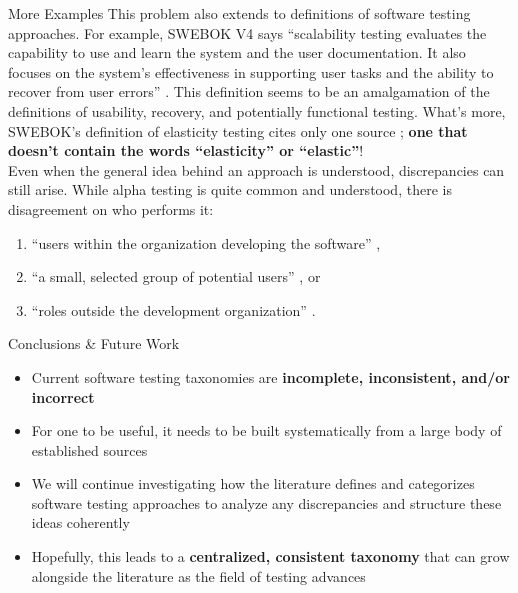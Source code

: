 \documentclass[22pt]{beamer}
\begin{document}
\begin{frame}[fragile]
\begin{textblock}{7.25}
\begin{block}{\fontsize{37}{20}\selectfont More Examples}
            This problem also extends to definitions of software testing
            approaches. For example, SWEBOK V4 says ``scalability testing
            evaluates the capability to use and learn the system and the user
            documentation. It also focuses on the system's effectiveness in
            supporting user tasks and the ability to recover from user errors''
            \cite[p.~5-9]{SWEBOK2024}. This definition seems to be an
            amalgamation of the definitions of usability, recovery, and
            potentially functional testing. What's more, SWEBOK's definition
            of elasticity testing cites only one source \cite[p.~5-9]{SWEBOK2024};
            \textbf{one that doesn't contain the words ``elasticity'' or ``elastic''}!
            \vspace{5mm}\\
            Even when the general idea behind an approach is understood,
            discrepancies can still arise. While alpha testing is quite common
            and understood, there is disagreement on who performs it:
            \begin{enumerate}
                \item ``users within the organization developing the software''
                      \cite[p.~17]{IEEE2017},
                \item ``a small, selected group of potential users''
                      \cite[p.~5-8]{SWEBOK2024}, or
                \item ``roles outside the development organization''
                      \cite{ISTQB}.
            \end{enumerate}
            \vspace{5mm}
        \end{block}

        \begin{block}{\fontsize{37}{20}\selectfont Conclusions \& Future Work}
            \begin{itemize}
                \item Current software testing taxonomies are \textbf{incomplete,
                          inconsistent, and/or incorrect}
                \item For one to be useful, it needs to be built systematically
                      from a large body of established sources
                \item We will continue investigating how the literature defines
                      and categorizes software testing approaches to analyze any
                      discrepancies and structure these ideas coherently
                \item Hopefully, this leads to a \textbf{centralized, consistent
                          taxonomy} that can grow alongside the literature as the
                      field of testing advances
            \end{itemize}
            \vspace{5mm}
        \end{block}


\end{textblock}
\end{frame}
\end{document}
